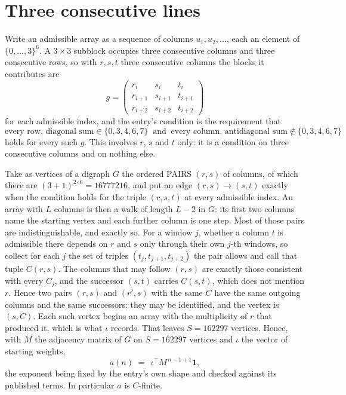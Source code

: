 \documentclass[11pt,a4paper]{article}
\theoremstyle{plain}
\theoremstyle{definition}
\begin{document}
\section{Three consecutive lines}

Write an admissible array as a sequence of columns $u_1,u_2,\dots$, each an element of
$\{0,\dots,3\}^{6}$. A $3\times3$ subblock occupies three consecutive columns and
three consecutive rows, so with $r,s,t$ three consecutive columns the blocks it
contributes are
\[
g=\begin{pmatrix}r_i&s_i&t_i\\ r_{i+1}&s_{i+1}&t_{i+1}\\ r_{i+2}&s_{i+2}&t_{i+2}\end{pmatrix}
\]
for each admissible index, and the entry's condition is the requirement that
\[
\text{every row, diagonal sum} \in \{0,3,4,6,7\}\ \text{ and }\ \text{every column, antidiagonal sum} \notin \{0,3,4,6,7\}
\]
holds for every such $g$. This involves $r$, $s$ and $t$ only: it is a condition on
three consecutive columns and on nothing else.

Take as vertices of a digraph $G$ the ordered PAIRS $(r,s)$ of columns, of which there are
$(3+1)^{2\cdot6}=16777216$, and put an edge $(r,s)\to(s,t)$ exactly when the condition
holds for the triple $(r,s,t)$ at every admissible index. An array with $L$ columns is then a
walk of length $L-2$ in $G$: its first two columns name the starting vertex and each further
column is one step. Most of those pairs are indistinguishable, and exactly so. For a window $j$, whether a column $t$ is admissible there depends on $r$ and $s$ only through their own $j$-th windows, so collect for each $j$ the set of triples $(t_j,t_{j+1},t_{j+2})$ the pair allows and call that tuple $C(r,s)$. The columns that may follow $(r,s)$ are exactly those consistent with every $C_j$, and the successor $(s,t)$ carries $C(s,t)$, which does not mention $r$. Hence two pairs $(r,s)$ and $(r',s)$ with the same $C$ have the same outgoing columns and the same successors: they may be identified, and the vertex is $(s,C)$. Each such vertex begins an array with the multiplicity of $r$ that produced it, which is what $\iota$ records. That leaves $S=162297$ vertices. Hence, with $M$ the adjacency matrix of $G$ on $S=162297$ vertices and
$\iota$ the vector of starting weights,
\[
a(n)\;=\;\,\iota^{\!\top}M^{\,n-1+1}\mathbf{1},
\]
the exponent being fixed by the entry's own shape and checked against its published terms.
In particular $a$ is $C$-finite.
\end{document}
